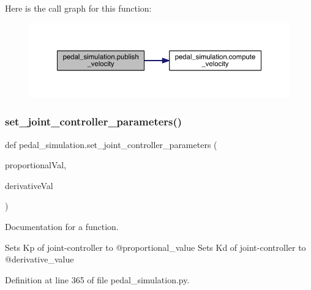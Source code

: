 Here is the call graph for this function\+:\nopagebreak
\begin{figure}[H]
\begin{center}
\leavevmode
\includegraphics[width=350pt]{namespacepedal__simulation_a82494ebbbf26d1df9ae71ffebd8e86b3_cgraph}
\end{center}
\end{figure}
\mbox{\label{namespacepedal__simulation_a0274d42f1436a50698c77d0aa0631318}} 
\subsubsection{\texorpdfstring{set\_joint\_controller\_parameters()}{set\_joint\_controller\_parameters()}}
{\footnotesize\ttfamily def pedal\+\_\+simulation.\+set\+\_\+joint\+\_\+controller\+\_\+parameters (\begin{DoxyParamCaption}\item[{}]{proportional\+Val,  }\item[{}]{derivative\+Val }\end{DoxyParamCaption})}



Documentation for a function. 

Sets Kp of joint-\/controller to @proportional\+\_\+value Sets Kd of joint-\/controller to @derivative\+\_\+value 

Definition at line 365 of file pedal\+\_\+simulation.\+py.


